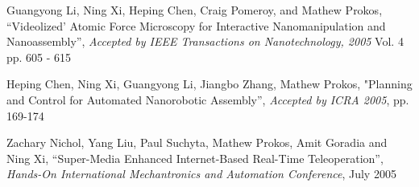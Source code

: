 \documentclass[line]{res}
\begin{document}
\begin{resume}
        \vspace{-2mm}
        Guangyong Li, Ning Xi, Heping Chen, Craig Pomeroy, and Mathew Prokos,
        ``Videolized' Atomic Force Microscopy for Interactive Nanomanipulation and Nanoassembly'',
        \textsl{Accepted by IEEE Transactions on Nanotechnology, 2005} Vol. 4 pp. 605 - 615

        \vspace{-2mm}
        Heping Chen, Ning Xi, Guangyong Li, Jiangbo Zhang, Mathew Prokos,
        "Planning and Control for Automated Nanorobotic Assembly'',
        \textsl{Accepted by ICRA 2005}, pp. 169-174

        \vspace{-2mm}
        Zachary Nichol, Yang Liu, Paul Suchyta, Mathew Prokos, Amit Goradia and Ning Xi, 
        ``Super-Media Enhanced Internet-Based Real-Time Teleoperation'',
        \textsl{Hands-On International Mechantronics and Automation Conference}, July 2005
\end{resume}
\end{document}
